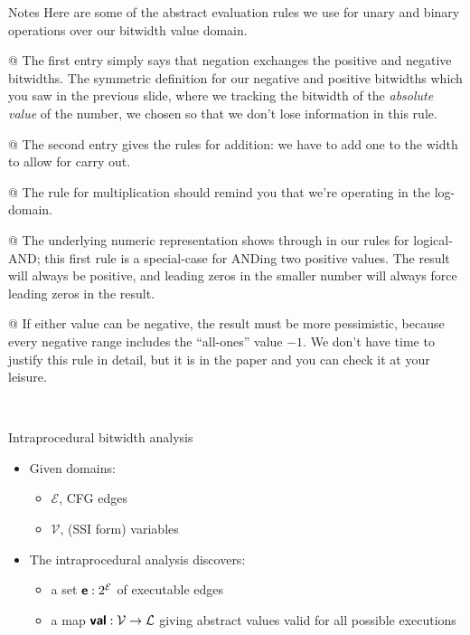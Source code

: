 \documentclass[%
pdf,
colorBG,
slideColor,
nototal,
oqe
]{prosper}
\newcommand{\func}[1]{\ensuremath{\text{\sffamily\bfseries #1}}}
\newenvironment{talknotes}{\begin{slide}{Notes}\tiny}{\end{slide}}
\begin{document}
\begin{talknotes}
Here are some of the abstract evaluation rules we use for
unary and binary operations over
our bitwidth value domain.

@ The first entry simply says that negation
exchanges the positive and negative bitwidths.
The symmetric definition for our negative and positive
bitwidths which you saw in the previous slide, where we 
tracking the bitwidth of the \textit{absolute value} of the number,
we chosen so that we don't lose information in this rule.

@ The second entry gives
the rules for addition: we have to add one to the width to allow for
carry out.

@ The rule for multiplication should remind you that we're
operating in the log-domain.  

@ The underlying numeric representation
shows through in our rules for logical-AND; this first rule is a
special-case for ANDing two positive values.  The result will always
be positive, and leading zeros in the smaller number will always force
leading zeros in the result.

@ If either value can be negative, the result must be more
pessimistic, because every negative range includes the ``all-ones''
value $-1$.  We don't have time to justify this rule in detail, but it
is in the paper and you can check it at your leisure.

~%
\end{talknotes}

\begin{slide}{Intraprocedural bitwidth analysis}
\begin{itemize}
\item Given domains:
\begin{itemize}
\item $\mathcal{E}$, CFG edges
\item $\mathcal{V}$, (SSI form) variables
\end{itemize}
\item The intraprocedural analysis discovers:
\begin{itemize}
\item a set $\func{e}:2^\mathcal{E}$ of executable edges
\item a map $\func{val}:\mathcal{V}\to\mathcal{L}$ giving abstract
  values valid for all possible executions
\end{itemize}
\end{itemize}
\end{slide}
\end{document}
